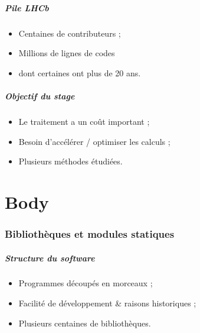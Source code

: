 \documentclass{beamer}
\begin{document}
\begin{frame}
    \frametitle{Pile LHCb}

    \begin{itemize}
        \item Centaines de contributeurs ;
        \item Millions de lignes de codes
        \item dont certaines ont plus de 20 ans.
    \end{itemize}
\end{frame}

\begin{frame}
    \frametitle{Objectif du stage}

    \begin{itemize}
        \item Le traitement a un coût important ;
        \item Besoin d'accélérer / optimiser les calculs ;
        \item Plusieurs méthodes étudiées.
    \end{itemize}
\end{frame}


\part{Body}
\begin{frame}
    \tableofcontents
\end{frame}

\section{Bibliothèques et modules statiques}

\begin{frame}
    \tableofcontents[currentsection]
\end{frame}

\begin{frame}[fragile]
    \frametitle{Structure du software}

    \begin{itemize}
        \item Programmes découpés en morceaux ;
        \item Facilité de développement \& raisons historiques ;
        \item Plusieurs centaines de bibliothèques.
    \end{itemize}
\end{frame}
\end{document}
